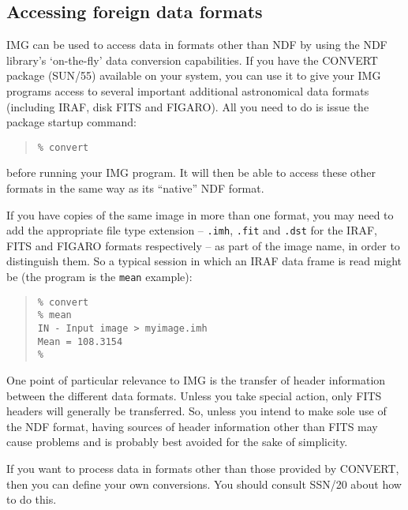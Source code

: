 \documentclass[twoside,11pt]{article}
\newcommand{\htmlref}[2]{#1}
\newcommand{\xref}[3]{#1}
\renewcommand{\_}{\texttt{\symbol{95}}}
\newcommand{\myverb}[1]{{\texttt{#1}}}
\newenvironment{code}{\begin{small} \begin{quote}}
                     {\end{quote} \end{small}}
\begin{document}
\subsection{Accessing \label{IMGFOREIGNDATAFORMATS} foreign data formats}
IMG can be used to access data in formats other than NDF by using the
NDF library's `on-the-fly' data conversion capabilities.  If you have
the CONVERT package (\xref{SUN/55}{sun55}{}) available on your system,
you can use it to give your IMG programs access to several important
\xref{additional astronomical data formats}{sun55}{sect_auto}
(including IRAF, disk FITS and FIGARO). All you need to do is issue
the package startup command:
\begin{code}
\begin{verbatim}
% convert
\end{verbatim}
\end{code}
before running your IMG program. It will then be able to access these other
formats in the same way as its ``native'' NDF format.

If you have copies of the same image in more than one format, you may
need to add the appropriate file type extension -- \myverb{.imh},
\myverb{.fit} and \myverb{.dst} for the IRAF, FITS and FIGARO formats
respectively -- as part of the image name, in order to distinguish
them.  So a typical session in which an IRAF data frame is read might
be (the program is the \htmlref{\myverb{mean}}{IMGMEAN}
example):
\begin{code}
\begin{verbatim}
% convert
% mean
IN - Input image > myimage.imh
Mean = 108.3154
%
\end{verbatim}
\end{code}

One point of particular relevance to IMG is the transfer of header
information between the different data formats. Unless you take
special action, only FITS headers will generally be transferred. So,
unless you intend to make sole use of the NDF format, having sources
of header information other than FITS may cause problems and is
probably best avoided for the sake of simplicity.

If you want to process data in formats other than those provided by
CONVERT, then you can define your own conversions. You should consult
\xref{SSN/20}{ssn20}{} about how to do this.
\end{document}
